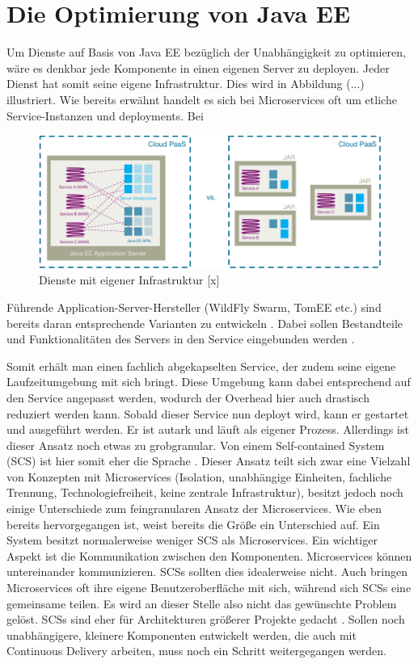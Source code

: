 \section{Die Optimierung von Java EE}
Um Dienste auf Basis von Java EE bezüglich der Unabhängigkeit zu optimieren, wäre es denkbar jede Komponente in einen eigenen Server zu deployen. Jeder Dienst hat somit seine eigene Infrastruktur. Dies wird in Abbildung (...) illustriert. Wie bereits erwähnt handelt es sich bei Microservices oft um etliche Service-Instanzen und deployments. Bei  


\begin{figure}[h!]
	\centering
	\includegraphics[width=1.0\linewidth]{images/mp}
	\caption{Dienste mit eigener Infrastruktur [x]}
	\label{fig:mp2}
\end{figure}


Führende Application-Server-Hersteller (WildFly Swarm, TomEE etc.) sind bereits daran entsprechende Varianten zu entwickeln \cite{LarsRowekamp.2016}. Dabei sollen Bestandteile und Funktionalitäten des Servers in den Service eingebunden werden \cite{jaxcenter.2016}.


Somit erhält man einen fachlich abgekapselten Service, der zudem seine eigene Laufzeitumgebung mit sich bringt. Diese Umgebung kann dabei entsprechend auf den Service angepasst werden, wodurch der Overhead hier auch drastisch reduziert werden kann. Sobald dieser Service nun deployt wird, kann er gestartet und ausgeführt werden. Er ist autark und läuft als eigener Prozess. Allerdings ist dieser Ansatz noch etwas zu grobgranular. Von einem Self-contained System (SCS) ist hier somit eher die Sprache \cite{jaxcenter.2016}. Dieser Ansatz teilt sich zwar eine Vielzahl von Konzepten mit Microservices (Isolation, unabhängige Einheiten, fachliche Trennung, Technologiefreiheit, keine zentrale Infrastruktur), besitzt jedoch noch einige Unterschiede zum feingranularen Ansatz der Microservices. Wie eben bereits hervorgegangen ist, weist bereits die Größe ein Unterschied auf. Ein System besitzt normalerweise weniger SCS als Microservices. Ein wichtiger Aspekt ist die Kommunikation zwischen den Komponenten. Microservices können untereinander kommunizieren. SCSs sollten dies idealerweise nicht. Auch bringen Microservices oft ihre eigene Benutzeroberfläche mit sich, während sich SCSs eine gemeinsame teilen. Es wird an dieser Stelle also nicht das gewünschte Problem gelöst. SCSs sind eher für Architekturen größerer Projekte gedacht \cite{selfcontainedservices.2017}. Sollen noch unabhängigere, kleinere Komponenten entwickelt werden, die auch mit Continuous Delivery arbeiten, muss noch ein Schritt weitergegangen werden. 